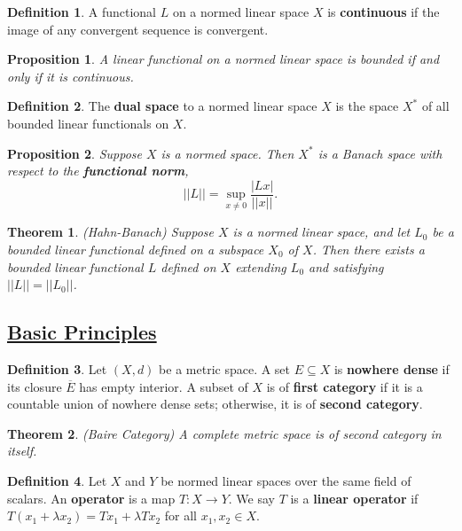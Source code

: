 \documentclass[11pt]{amsart}
\newtheorem*{theorem*}{Theorem}
\newtheorem*{proposition*}{Proposition}
\theoremstyle{definition}
\newtheorem*{definition*}{Definition}
\renewcommand\:{\colon}
\renewcommand\bar[1]{\overline{#1}}
\begin{document}
\begin{definition*}
	A functional $L$ on a normed linear space $X$ is \textbf{continuous} if the image of any convergent sequence is convergent.
\end{definition*}

\begin{proposition*}
	A linear functional on a normed linear space is bounded if and only if it is continuous.
\end{proposition*}

\begin{definition*}
	The \textbf{dual space} to a normed linear space $X$ is the space $X^*$ of all bounded linear functionals on $X$.
\end{definition*}

\begin{proposition*}
	Suppose $X$ is a normed space. Then $X^*$ is a Banach space with respect to the \textbf{functional norm},
		\[ ||L|| = \sup_{x \neq 0} \frac{|Lx|}{||x||}. \]
\end{proposition*}

\begin{theorem*}
	\textnormal{(Hahn-Banach)} Suppose $X$ is a normed linear space, and let $L_0$ be a bounded linear functional defined on a subspace $X_0$ of $X$. Then there exists a bounded linear functional $L$ defined on $X$ extending $L_0$ and satisfying $||L|| = ||L_0||$.
\end{theorem*}

\vskip20pt




\subsection*{\underline{Basic Principles}}

\begin{definition*}
	Let $(X, d)$ be a metric space. A set $E \subseteq X$ is \textbf{nowhere dense} if its closure $\bar{E}$ has empty interior. A subset of $X$ is of \textbf{first category} if it is a countable union of nowhere dense sets; otherwise, it is of \textbf{second category}.
\end{definition*}

\begin{theorem*}
	\textnormal{(Baire Category)} A complete metric space is of second category in itself.
\end{theorem*}

\begin{definition*}
	Let $X$ and $Y$ be normed linear spaces over the same field of scalars. An \textbf{operator} is a map $T\: X \to Y$. We say $T$ is a \textbf{linear operator} if $T(x_1 + \lambda x_2) = Tx_1 + \lambda Tx_2$ for all $x_1, x_2 \in X$.
\end{definition*}
\end{document}
